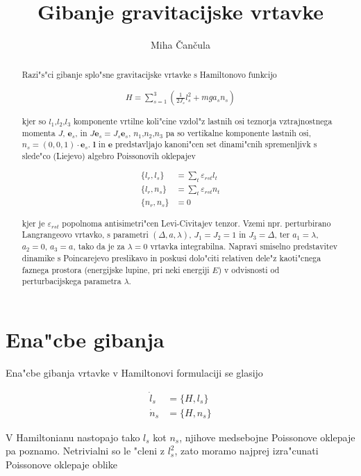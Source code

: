 \documentclass[a4paper,10pt]{article}
\title{Gibanje gravitacijske vrtavke}
\author{Miha \v Can\v cula}
\renewcommand{\vec}{\mathbf}
\newcommand{\eps}{\varepsilon}
\begin{document}
\maketitle

\begin{abstract}
Razi"s"ci gibanje splo"sne gravitacijske vrtavke s Hamiltonovo funkcijo

\begin{align}
  H = \sum_{s=1}^{3}\left(\frac{1}{2J_s}l_s^2 + mga_s n_s\right)
\end{align}

kjer so $l_1$,$l_2$,$l_3$ komponente vrtilne koli"cine vzdol"z lastnih osi teznorja vztrajnostnega momenta $J$, $\vec e_s$, in $J\vec e_s = J_s\vec e_s$, $n_1$,$n_2$,$n_3$ pa so vertikalne komponente lastnih osi, $n_s = (0,0,1)\cdot \vec e_s$. $\vec l$ in $\vec e$ predstavljajo kanoni"cen set dinami"cnih spremenljivk s slede"co (Liejevo) algebro Poissonovih oklepajev

\begin{align}
  \{l_r, l_s\} &= \sum_t \eps_{rst}l_t \\
  \{l_r, n_s\} &= \sum_t \eps_{rst}n_t \\
  \{n_r, n_s\} &= 0
\end{align}

kjer je $\eps_{rst}$ popolnoma antisimetri"cen Levi-Civitajev tenzor. Vzemi npr. perturbirano Langrangeovo vrtavko, s parametri $(\Delta, a, \lambda)$, $J_1=J_2 = 1$ in $J_3=\Delta$, ter $a_1 = \lambda$, $a_2=0$, $a_3=a$, tako da je za $\lambda=0$ vrtavka integrabilna. Napravi smiselno predstavitev dinamike s Poincarejevo preslikavo in poskusi dolo"citi relativen dele"z kaoti"cnega faznega prostora (energijske lupine, pri neki energiji $E$) v odvisnosti od perturbacijskega parametra $\lambda$. 
\end{abstract}

\section{Ena"cbe gibanja}

Ena"cbe gibanja vrtavke v Hamiltonovi formulaciji se glasijo

\begin{align}
  \dot l_s &= \{H,l_s\} \\
  \dot n_s &= \{H,n_s\}
\end{align}

V Hamiltonianu nastopajo tako $l_s$ kot $n_s$, njihove medsebojne Poissonove oklepaje pa poznamo. Netrivialni so le "cleni z $l_s^2$, zato moramo najprej izra"cunati Poissonove oklepaje oblike
\end{document}
